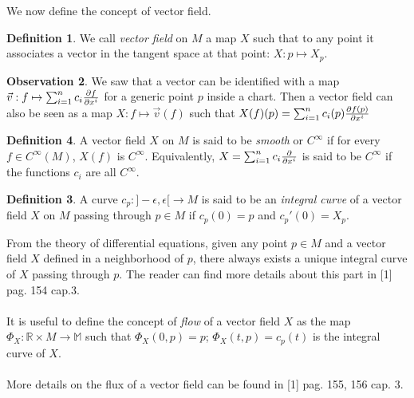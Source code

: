 \documentclass[12pt,a4paper]{report}
\theoremstyle{definition}
\newtheorem{Def}{Definition}[chapter]
\theoremstyle{Theorem}
\theoremstyle{definition}
\theoremstyle{definition}
\newtheorem{Obs}[Def]{Observation}
\begin{document}
	We now define the concept of vector field.
	\begin{Def}
		We call \textit{vector field} on $M$ a map $X$ such that to any point it associates a vector in the tangent space at that point: $X:p\mapsto X_p$. 
	\end{Def}
	\begin{Obs}
		We saw that a vector can be identified with a map $\vec{v}:f\mapsto\sum_{i=1}^{n}c_i{\partial f\over \partial x^i}$ for a generic point $p$ inside a chart. Then a vector field can also be seen as a map $X:f\mapsto\vec{v}(f)$ such that $X(f)(p)=\sum_{i=1}^{n}c_i(p){\partial f(p)\over \partial x^i}$
	\end{Obs}
	\begin{Def}
		A vector field $X$ on $M$ is said to be \textit{smooth} or $C^\infty$ if for every $f\in C^\infty(M)$, $X(f)$ is $C^\infty$. Equivalently, $X=\sum_{i=1}^{n}c_i{\partial\over \partial x^i}$ is said to be $C^\infty$ if the functions $c_i$ are all $C^\infty$.
		\begin{Def}
			A curve $c_p:]-\epsilon,\epsilon[\rightarrow M$ is said to be an \textit{integral curve} of a vector field $X$ on $M$ passing through $p\in M$ if $c_p(0)=p$ and $c_p'(0)=X_p$.
		\end{Def}
		From the theory of differential equations, given any point $p\in M$ and a vector field $X$ defined in a neighborhood of $p$, there always exists a unique integral curve of $X$ passing through $p$. The reader can find more details about this part in [1] pag. 154 cap.3.\\
		\\
		It is useful to define the concept of \textit{flow} of a vector field $X$ as the map $\Phi_X:\mathbb{R}\times M\rightarrow\mathbb{M}$ such that $\Phi_X(0,p)=p$; $\Phi_X(t,p)=c_p(t)$ is the integral curve of $X$.\\
		\\
		More details on the flux of a vector field can be found in [1] pag. 155, 156 cap. 3.
	\end{Def}
\end{document}
